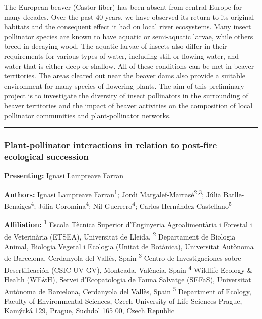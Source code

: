 \documentclass[
  letterpaper,
  DIV=11,
  numbers=noendperiod]{scrartcl}
\begin{document}
The European beaver (Castor fiber) has been absent from central Europe
for many decades. Over the past 40 years, we have observed its return to
its original habitats and the consequent effect it had on local river
ecosystems. Many insect pollinator species are known to have aquatic or
semi-aquatic larvae, while others breed in decaying wood. The aquatic
larvae of insects also differ in their requirements for various types of
water, including still or flowing water, and water that is either deep
or shallow. All of these conditions can be met in beaver territories.
The areas cleared out near the beaver dams also provide a suitable
environment for many species of flowering plants. The aim of this
preliminary project is to investigate the diversity of insect
pollinators in the surrounding of beaver territories and the impact of
beaver activities on the composition of local pollinator communities and
plant-pollinator networks.

\begin{center}\rule{0.5\linewidth}{0.5pt}\end{center}

\subsubsection{Plant-pollinator interactions in relation to post-fire
ecological
succession}\label{plant-pollinator-interactions-in-relation-to-post-fire-ecological-succession}

\textbf{Presenting:} Ignasi Lampreave Farran

\textbf{Authors:} Ignasi Lampreave Farran\textsuperscript{1}; Jordi
Margalef-Marrasé\textsuperscript{2,3}; Júlia
Batlle-Benaiges\textsuperscript{4}; Júlia Coromina\textsuperscript{4};
Nil Guerrero\textsuperscript{4}; Carlos
Hernández-Castellano\textsuperscript{5}

\textbf{Affiliation:} \textsuperscript{1} Escola Tècnica Superior
d'Enginyeria Agroalimentària i Forestal i de Veterinària (ETSEA),
Universitat de Lleida. \textsuperscript{2} Departament de Biologia
Animal, Biologia Vegetal i Ecologia (Unitat de Botànica), Universitat
Autònoma de Barcelona, Cerdanyola del Vallès, Spain \textsuperscript{3}
Centro de Investigaciones sobre Desertificación (CSIC-UV-GV), Montcada,
València, Spain \textsuperscript{4} Wildlife Ecology \& Health (WE\&H),
Servei d'Ecopatologia de Fauna Salvatge (SEFaS), Universitat Autònoma de
Barcelona, Cerdanyola del Vallès, Spain \textsuperscript{5} Department
of Ecology, Faculty of Environmental Sciences, Czech University of Life
Sciences Prague, Kamýcká 129, Prague, Suchdol 165 00, Czech Republic
\end{document}
